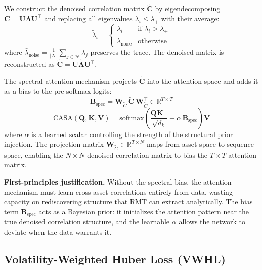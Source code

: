 \documentclass[conference]{IEEEtran}
\begin{document}
We construct the denoised correlation matrix $\tilde{\mathbf{C}}$ by eigendecomposing $\mathbf{C} = \mathbf{U} \boldsymbol{\Lambda} \mathbf{U}^\top$ and replacing all eigenvalues $\lambda_i \le \lambda_+$ with their average:
\begin{equation}
\tilde{\lambda}_i = \begin{cases}
\lambda_i & \text{if } \lambda_i > \lambda_+ \\
\bar{\lambda}_{\text{noise}} & \text{otherwise}
\end{cases}
\end{equation}
where $\bar{\lambda}_{\text{noise}} = \frac{1}{|\mathcal{N}|}\sum_{j \in \mathcal{N}} \lambda_j$ preserves the trace. The denoised matrix is reconstructed as $\tilde{\mathbf{C}} = \mathbf{U} \tilde{\boldsymbol{\Lambda}} \mathbf{U}^\top$.

The spectral attention mechanism projects $\tilde{\mathbf{C}}$ into the attention space and adds it as a bias to the pre-softmax logits:
\begin{equation}
\mathbf{B}_{\text{spec}} = \mathbf{W}_{\tilde{C}} \,\tilde{\mathbf{C}}\, \mathbf{W}_{\tilde{C}}^\top \in \mathbb{R}^{T \times T}
\end{equation}
\begin{equation}
\text{CASA}(\mathbf{Q}, \mathbf{K}, \mathbf{V}) = \text{softmax}\!\left(\frac{\mathbf{Q}\mathbf{K}^\top}{\sqrt{d_k}} + \alpha \, \mathbf{B}_{\text{spec}}\right)\mathbf{V}
\label{eq:casa}
\end{equation}
where $\alpha$ is a learned scalar controlling the strength of the structural prior injection. The projection matrix $\mathbf{W}_{\tilde{C}} \in \mathbb{R}^{T \times N}$ maps from asset-space to sequence-space, enabling the $N \times N$ denoised correlation matrix to bias the $T \times T$ attention matrix.

\textbf{First-principles justification.} Without the spectral bias, the attention mechanism must learn cross-asset correlations entirely from data, wasting capacity on rediscovering structure that RMT can extract analytically. The bias term $\mathbf{B}_{\text{spec}}$ acts as a Bayesian prior: it initializes the attention pattern near the true denoised correlation structure, and the learnable $\alpha$ allows the network to deviate when the data warrants it.

\subsection{Volatility-Weighted Huber Loss (VWHL)}
\label{sec:vwhl}
\end{document}

